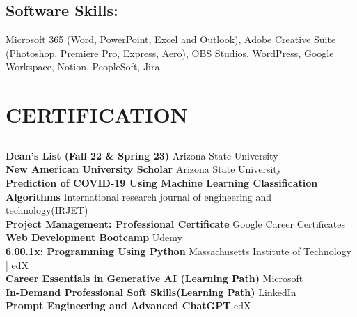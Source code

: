 \documentclass[a4paper]{deedy-resume} %
\begin{document}
\begin{minipage}[t]{0.33\textwidth}
\sectionspace %



\subsection{Software Skills: }

Microsoft 365 (Word, PowerPoint, Excel and Outlook), 
Adobe Creative Suite (Photoshop, Premiere Pro, Express, Aero),
OBS Studios, WordPress, Google Workspace, Notion, PeopleSoft, Jira


\sectionspace %


\section{CERTIFICATION}




\subsection{}

\textbf{Dean's List (Fall 22 \& Spring 23)} \textbullet{} Arizona State University \\
\textbf{New American University Scholar} \textbullet{} Arizona State University \\
\textbf{Prediction of COVID-19 Using Machine Learning Classification Algorithms} \textbullet{} International research journal of engineering and technology(IRJET)  \\
\textbf{Project Management: Professional Certificate} \textbullet{} Google Career Certificates \\
\textbf{Web Development Bootcamp} \textbullet{} Udemy  \\
\textbf{6.00.1x: Programming Using Python} \textbullet{} Massachusetts Institute of Technology | edX\\
\textbf{Career Essentials in Generative AI (Learning Path)} \textbullet{} Microsoft \\
\textbf{In-Demand Professional Soft Skills(Learning Path)} \textbullet{} LinkedIn \\
\textbf{Prompt Engineering and Advanced ChatGPT} \textbullet{} edX \\



\sectionspace %






\end{minipage} %
\end{document}
